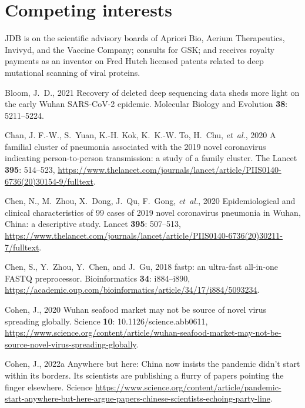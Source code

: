 \documentclass[9pt,twocolumn,twoside]{gsajnl_modified}
\begin{document}
{\section{Competing interests}
JDB is on the scientific advisory boards of Apriori Bio, Aerium Therapeutics, Invivyd, and the Vaccine Company; consults for GSK; and receives royalty payments as an inventor on Fred Hutch licensed patents related to deep mutational scanning of viral proteins.

\begin{thebibliography}{44}

{Bloom, J.~D.}, 2021 Recovery of deleted deep sequencing data sheds more light
  on the early {Wuhan SARS-CoV-2} epidemic. Molecular Biology and Evolution
  {\bf 38}: 5211--5224.

{Chan, J. F.-W., S.~Yuan, K.-H. Kok, K.~K.-W. To, H.~Chu, {\em et~al.\/}}, 2020
  A familial cluster of pneumonia associated with the 2019 novel coronavirus
  indicating person-to-person transmission: a study of a family cluster. The
  Lancet {\bf 395}: 514--523,
  \url{https://www.thelancet.com/journals/lancet/article/PIIS0140-6736(20)30154-9/fulltext}.

{Chen, N., M.~Zhou, X.~Dong, J.~Qu, F.~Gong, {\em et~al.\/}}, 2020
  Epidemiological and clinical characteristics of 99 cases of 2019 novel
  coronavirus pneumonia in {Wuhan, China}: a descriptive study. Lancet {\bf
  395}: 507--513,
  \url{https://www.thelancet.com/journals/lancet/article/PIIS0140-6736(20)30211-7/fulltext}.

{Chen, S., Y.~Zhou, Y.~Chen, {\rm and} J.~Gu}, 2018 fastp: an ultra-fast
  all-in-one {FASTQ} preprocessor. Bioinformatics {\bf 34}: i884--i890,
  \url{https://academic.oup.com/bioinformatics/article/34/17/i884/5093234}.

{Cohen, J.}, 2020 Wuhan seafood market may not be source of novel virus
  spreading globally. Science {\bf 10}: 10.1126/science.abb0611,
  \url{https://www.science.org/content/article/wuhan-seafood-market-may-not-be-source-novel-virus-spreading-globally}.

{Cohen, J.}, 2022{a} {Anywhere but here: China now insists the pandemic
  didn’t start within its borders. Its scientists are publishing a flurry of
  papers pointing the finger elsewhere}. Science
  \url{https://www.science.org/content/article/pandemic-start-anywhere-but-here-argue-papers-chinese-scientists-echoing-party-line}.


\end{thebibliography}}
\end{document}
